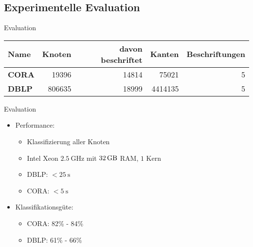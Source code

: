 \subsection{Experimentelle Evaluation}
\begin{frame}{Evaluation}
    \begin{table}
        \begin{tabular}{|l||r|r|r|r|}\hline
        \textbf{Name} & \textbf{Knoten} & \textbf{davon beschriftet} & \textbf{Kanten}  & \textbf{Beschriftungen} \\ \hline\hline
        \textbf{CORA} & \num{19396}  & \num{14814}             & \num{75021}   & 5              \\
        \textbf{DBLP} & \num{806635} & \num{18999 }            & \num{4414135} & 5              \\\hline
        \end{tabular}
    \end{table}
\end{frame}

\begin{frame}{Evaluation}
    \begin{itemize}
        \item<1-> Performance:
            \begin{itemize}
                \item<2-> Klassifizierung aller Knoten
                \item<3-> Intel Xeon $\SI{2.5}{\GHz}$ mit $\SI{32}{\giga\byte}$ RAM, $1$ Kern
                \item<4-> DBLP: $< \SI{25}{\second}$
                \item<5-> CORA: $< \SI{5}{\second}$
            \end{itemize}
        \item<6-> Klassifikationsgüte:
            \begin{itemize}
                \item<7-> CORA: 82\% - 84\%
                \item<8-> DBLP: 61\% - 66\%
            \end{itemize}
    \end{itemize}
\end{frame}

